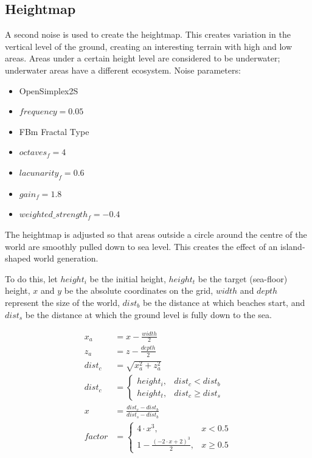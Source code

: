 \documentclass{article}
\begin{document}
\begin{multicols}{2}
        \subsection{Heightmap}
        
        A second noise is used to create the heightmap. This creates variation in the vertical level of the ground, creating an interesting terrain with high and low areas. Areas under a certain height level are considered to be underwater; underwater areas have a different ecosystem. Noise parameters:

        \begin{itemize}
            \setlength\itemsep{0.01em}
            \item OpenSimplex2S
            \item $frequency = 0.05$
            \item FBm Fractal Type
            \item $octaves_f = 4$
            \item $lacunarity_f = 0.6$
            \item $gain_f = 1.8$
            \item $weighted\_strength_f = -0.4$
        \end{itemize}
        
        The heightmap is adjusted so that areas outside a circle around the centre of the world are smoothly pulled down to sea level. This creates the effect of an island-shaped world generation.

        To do this, let $height_i$ be the initial height, $height_t$ be the target (sea-floor) height, $x$ and $y$ be the absolute coordinates on the grid, $width$ and $depth$ represent the size of the world, $dist_b$ be the distance at which beaches start, and $dist_s$ be the distance at which the ground level is fully down to the sea.

        \[
            \begin{aligned}
                x_a &= x - \frac{width}{2} \\
                z_a &= z - \frac{depth}{2} \\
                dist_c &= \sqrt{x_a^2 + z_a^2} \\
                dist_c &= \begin{cases}
                    height_i, &dist_c < dist_b \\
                    height_t, &dist_c \ge dist_s
                \end{cases} \\
                x &= \frac{dist_c - dist_b}{dist_s - dist_b} \\
                factor &= \begin{cases}
                    4 \cdot x^3, &x < 0.5 \\
                    1 - \frac{(-2 \cdot x + 2)^3}{2}, &x \ge 0.5
                \end{cases}
            \end{aligned}
        \]


\end{multicols}
\end{document}
